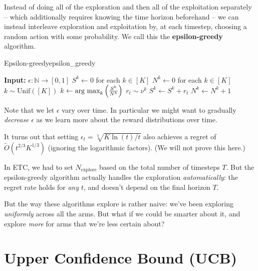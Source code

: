 \documentclass[\main/main]{subfiles}
\newcommand{\Nex}{N_{\text{explore}}}
\begin{document}
Instead of doing all of the exploration and then all of the exploitation separately -- which additionally requires knowing the time horizon beforehand -- we can instead interleave exploration and exploitation by, at each timestep, choosing a random action with some probability. We call this the \textbf{epsilon-greedy} algorithm.

\begin{definition}{Epsilon-greedy}{epsilon_greedy}
\begin{algorithmic}
\State \textbf{Input:} $\epsilon : \mathbb{N} \to [0, 1]$
\State $S^k \gets 0$ for each $k \in [K]$ 
\State $N^k \gets 0$ for each $k \in [K]$ 
        \State $k \sim \text{Unif}([K])$
    \Else
        \State $k \gets \operatorname*{\textrm{arg\ max}}_k \left(\frac{S^k}{N^k}\right)$
    \EndIf
    \State $r_t \sim \nu^k$
    \State $S^k \gets S^k + r_t$
    \State $N^k \gets N^k + 1$
\EndFor
\end{algorithmic}
\end{definition}

Note that we let $\epsilon$ vary over time. In particular we might want to gradually \emph{decrease} $\epsilon$ as we learn more about the reward distributions over time.

It turns out that setting $\epsilon_t = \sqrt[3]{K \ln(t)/t}$ also achieves a regret of $\tilde O(t^{2/3} K^{1/3})$ (ignoring the logarithmic factors). (We will not prove this here.)


In ETC, we had to set $\Nex$ based on the total number of timesteps $T$. But the epsilon-greedy algorithm actually handles the exploration \emph{automatically}: the regret rate holds for \emph{any} $t$, and doesn't depend on the final horizon $T$.

But the way these algorithms explore is rather naive: we've been exploring \emph{uniformly} across all the arms. But what if we could be smarter about it, and explore \emph{more} for arms that we're less certain about?


\section{Upper Confidence Bound (UCB)}
\end{document}
